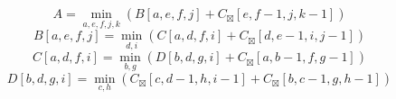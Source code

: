 \documentclass{article}
\begin{document}
$$ A =\min_{ a,e,f,j,k } \left( B\left[a,e,f,j\right]+C_{\boxtimes}\left[e,f-1,j,k-1\right]\right) $$
$$ B\left[ a,e,f,j \right] =\min_{ d,i } \left( C\left[a,d,f,i\right]+C_{\boxtimes}\left[d,e-1,i,j-1\right]\right) $$
$$ C\left[ a,d,f,i \right] =\min_{ b,g } \left( D\left[b,d,g,i\right]+C_{\boxtimes}\left[a,b-1,f,g-1\right]\right) $$
$$ D\left[ b,d,g,i \right] =\min_{ c,h } \left( C_{\boxtimes}\left[c,d-1,h,i-1\right]+C_{\boxtimes}\left[b,c-1,g,h-1\right]\right) $$
\end{document}
